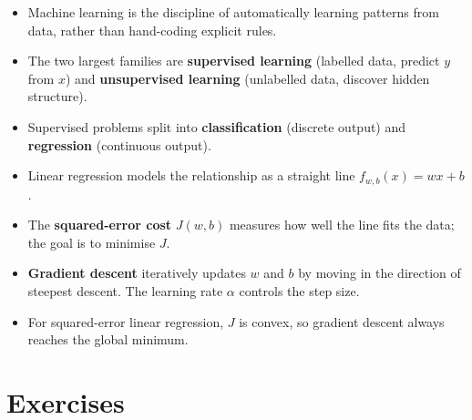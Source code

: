 \begin{itemize}
\item Machine learning is the discipline of automatically learning patterns from
  data, rather than hand-coding explicit rules.
\item The two largest families are \textbf{supervised learning} (labelled data,
  predict $y$ from $x$) and \textbf{unsupervised learning} (unlabelled data,
  discover hidden structure).
\item Supervised problems split into \textbf{classification} (discrete output)
  and \textbf{regression} (continuous output).
\item Linear regression models the relationship as a straight line
  $f_{w,b}(x)=wx+b$.
\item The \textbf{squared-error cost} $J(w,b)$ measures how well the line fits
  the data; the goal is to minimise $J$.
\item \textbf{Gradient descent} iteratively updates $w$ and $b$ by moving in
  the direction of steepest descent. The learning rate $\alpha$ controls the
  step size.
\item For squared-error linear regression, $J$ is convex, so gradient descent
  always reaches the global minimum.
\end{itemize}

\section*{Exercises}

